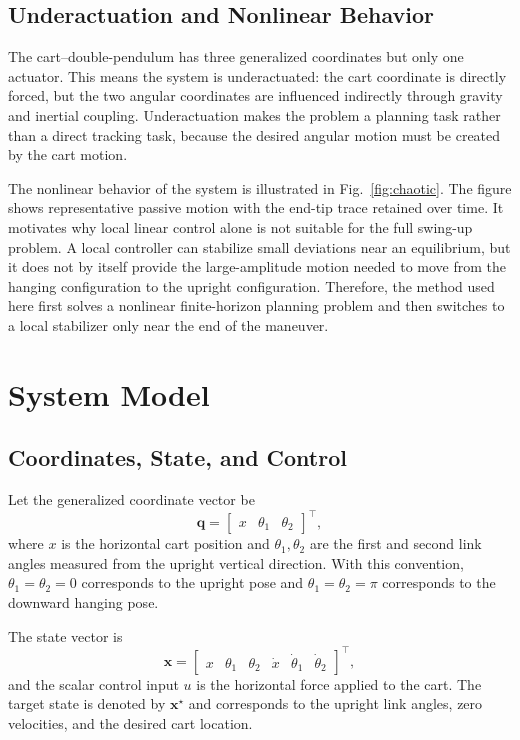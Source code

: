 \documentclass[conference]{IEEEtran}
\begin{document}
\subsection{Underactuation and Nonlinear Behavior}
The cart--double-pendulum has three generalized coordinates but only one actuator. This means the system is underactuated: the cart coordinate is directly forced, but the two angular coordinates are influenced indirectly through gravity and inertial coupling. Underactuation makes the problem a planning task rather than a direct tracking task, because the desired angular motion must be created by the cart motion.

The nonlinear behavior of the system is illustrated in Fig.~\ref{fig:chaotic}. The figure shows representative passive motion with the end-tip trace retained over time. It motivates why local linear control alone is not suitable for the full swing-up problem. A local controller can stabilize small deviations near an equilibrium, but it does not by itself provide the large-amplitude motion needed to move from the hanging configuration to the upright configuration. Therefore, the method used here first solves a nonlinear finite-horizon planning problem and then switches to a local stabilizer only near the end of the maneuver.

\section{System Model}
\subsection{Coordinates, State, and Control}
Let the generalized coordinate vector be
\begin{equation}
\bm{q}=\begin{bmatrix}x&\theta_1&\theta_2\end{bmatrix}^{\top},
\end{equation}
where $x$ is the horizontal cart position and $\theta_1,\theta_2$ are the first and second link angles measured from the upright vertical direction. With this convention, $\theta_1=\theta_2=0$ corresponds to the upright pose and $\theta_1=\theta_2=\pi$ corresponds to the downward hanging pose.

The state vector is
\begin{equation}
\bm{x}
=
\begin{bmatrix}
x & \theta_1 & \theta_2 & \dot{x} & \dot{\theta}_1 & \dot{\theta}_2
\end{bmatrix}^{\top},
\end{equation}
and the scalar control input $u$ is the horizontal force applied to the cart. The target state is denoted by $\bm{x}^{\star}$ and corresponds to the upright link angles, zero velocities, and the desired cart location.
\end{document}
